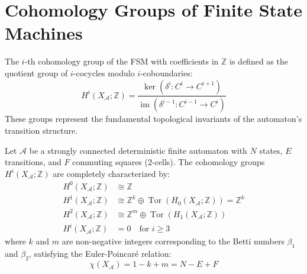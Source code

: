 \section{Cohomology Groups of Finite State Machines}

The $i$-th cohomology group of the FSM with coefficients in $\mathbb{Z}$ is defined as the quotient group of $i$-cocycles modulo $i$-coboundaries:
\[ H^i(X_\mathcal{A}; \mathbb{Z}) = \frac{\ker(\delta^i : C^i \to C^{i+1})}{\operatorname{im}(\delta^{i-1} : C^{i-1} \to C^i)} \]
These groups represent the fundamental topological invariants of the automaton's transition structure.

\begin{theorem}
Let $\mathcal{A}$ be a strongly connected deterministic finite automaton with $N$ states, $E$ transitions, and $F$ commuting squares (2-cells). The cohomology groups $H^i(X_\mathcal{A}; \mathbb{Z})$ are completely characterized by:
\begin{align*}
H^0(X_\mathcal{A}; \mathbb{Z}) &\cong \mathbb{Z} \\
H^1(X_\mathcal{A}; \mathbb{Z}) &\cong \mathbb{Z}^k \oplus \operatorname{Tor}(H_0(X_\mathcal{A}; \mathbb{Z})) = \mathbb{Z}^k \\
H^2(X_\mathcal{A}; \mathbb{Z}) &\cong \mathbb{Z}^m \oplus \operatorname{Tor}(H_1(X_\mathcal{A}; \mathbb{Z})) \\
H^i(X_\mathcal{A}; \mathbb{Z}) &= 0 \quad \text{for } i \ge 3
\end{align*}
where $k$ and $m$ are non-negative integers corresponding to the Betti numbers $\beta_1$ and $\beta_2$, satisfying the Euler-Poincaré relation:
\[ \chi(X_\mathcal{A}) = 1 - k + m = N - E + F \]
\end{theorem}
